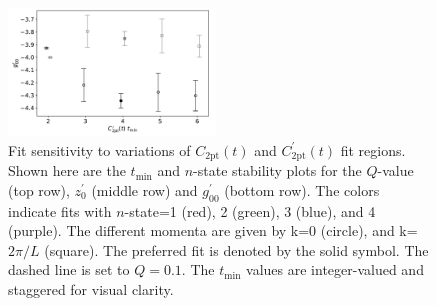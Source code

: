 \documentclass[prd,aps,twocolumn,superscriptaddress,tightenlines,nofootinbib,floatfix,preprintnumbers,10pt]{revtex4-1}
\begin{document}
\begin{figure}[h]
{		\includegraphics[width=0.49\textwidth]{plots/figures/3296_d2pt_dgV.pdf}
		\caption{Fit sensitivity to variations of $C_{\mathrm{2pt}}(t)$ and $C^\prime_{\mathrm{2pt}}(t)$ fit regions. Shown here are the $t_{\mathrm{min}}$ and $n$-state stability plots for the $Q$-value (top row), $z^\prime_0$ (middle row) and $g^\prime_{00}$ (bottom row). The colors indicate fits with $n$-state=1 (red), 2 (green), 3 (blue), and 4 (purple). The different momenta are given by k=0 (circle), and k=$2\pi/L$ (square). The preferred fit is denoted by the solid symbol. The dashed line is set to $Q=0.1$. The $t_{\mathrm{min}}$ values are integer-valued and staggered for visual clarity.}
		\label{fig:stability_c2pt}
}\end{figure}
\end{document}
